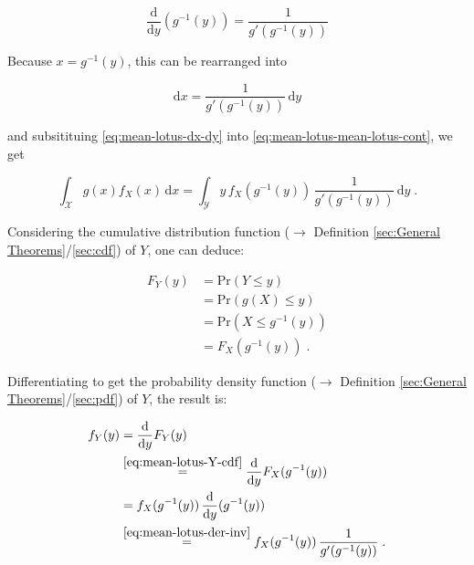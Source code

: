 \documentclass[a4paper,12pt,twoside]{book}
\begin{document}
\begin{equation} \label{eq:mean-lotus-der-inv}
\frac{\mathrm{d}}{\mathrm{d}y} (g^{-1}(y)) = \frac{1}{g'(g^{-1}(y))}
\end{equation}

Because $x = g^{-1}(y)$, this can be rearranged into

\begin{equation} \label{eq:mean-lotus-dx-dy}
\mathrm{d}x = \frac{1}{g'(g^{-1}(y))} \, \mathrm{d}y
\end{equation}

and subsitituing \eqref{eq:mean-lotus-dx-dy} into \eqref{eq:mean-lotus-mean-lotus-cont}, we get

\begin{equation} \label{eq:mean-lotus-mean-lotus-cont-s1}
\int_{\mathcal{X}} g(x) f_X(x) \, \mathrm{d}x = \int_{\mathcal{Y}} y \, f_X(g^{-1}(y)) \, \frac{1}{g'(g^{-1}(y))} \, \mathrm{d}y \; .
\end{equation}

Considering the cumulative distribution function ($\rightarrow$ Definition \ref{sec:General Theorems}/\ref{sec:cdf}) of $Y$, one can deduce:

\begin{equation} \label{eq:mean-lotus-Y-cdf}
\begin{split}
F_Y(y) &= \mathrm{Pr}(Y \leq y) \\
&= \mathrm{Pr}(g(X) \leq y) \\
&= \mathrm{Pr}(X \leq g^{-1}(y)) \\
&= F_X(g^{-1}(y)) \; .
\end{split}
\end{equation}

Differentiating to get the probability density function ($\rightarrow$ Definition \ref{sec:General Theorems}/\ref{sec:pdf}) of $Y$, the result is:

\begin{equation} \label{eq:mean-lotus-Y-pdf}
\begin{split}
f_Y(y) &= \frac{\mathrm{d}}{\mathrm{d}y} F_Y(y) \\
&\overset{\eqref{eq:mean-lotus-Y-cdf}}{=} \frac{\mathrm{d}}{\mathrm{d}y} F_X(g^{-1}(y)) \\
&= f_X(g^{-1}(y)) \, \frac{\mathrm{d}}{\mathrm{d}y} (g^{-1}(y)) \\
&\overset{\eqref{eq:mean-lotus-der-inv}}{=} f_X(g^{-1}(y)) \, \frac{1}{g'(g^{-1}(y))} \; .
\end{split}
\end{equation}
\end{document}
